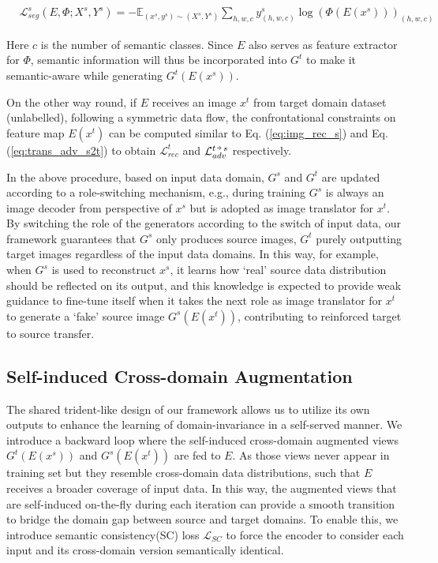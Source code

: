 \documentclass{bmvc2k}
\newcommand{\Eq}[1]{Eq. (\ref{eq:#1})}
\newcommand{\veryshortarrow}[1][3pt]{\mathrel{\hbox{\rule[\dimexpr\fontdimen22\textfont2-.2pt\relax]{#1}{.4pt}}\mkern-4mu\hbox{\usefont{U}{lasy}{m}{n}\symbol{41}}}}
\begin{document}
\begin{align}
    \label{eq:source_seg}
    &{\mathcal{L}^{s}_{seg}(E,\Phi; {X}^{s}, {Y}^{s})} = -\mathbb{E}_{({x}^{s}, {y}^{s})\sim ({X}^{s}, {Y}^{s})} \sum_{h,w,c} {y}^{s}_{(h,w,c)} \log( \Phi({E(x^{s})}))_{(h,w,c)}
\end{align}
\noindent 

Here $c$ is the number of semantic classes. Since ${E}$ also serves as feature extractor for ${\Phi}$, semantic information will thus be incorporated into ${G^{t}}$ to make it semantic-aware while generating ${G^{t}({E(x^{s})})}$. 




On the other way round, if ${E}$ receives an image ${{x}^{t}}$ from target domain dataset (unlabelled), following a symmetric data flow, the confrontational constraints on feature map ${E(x^{t})}$ can be computed similar to \Eq{img_rec_s} and \Eq{trans_adv_s2t} to obtain ${\mathcal{L}^{t}_{rec}}$ and ${\mathcal{L}^{t\,\veryshortarrow\,s}_{adv}}$ respectively.




In the above procedure, based on input data domain, ${G^{s}}$ and ${G^{t}}$ are updated according to a role-switching mechanism, e.g., during training ${G^{s}}$ is always an image decoder from perspective of $x^{s}$ but is adopted as image translator for $x^{t}$. By switching the role of the generators according to the switch of input data, our framework guarantees that ${G^{s}}$ only produces source images, ${G^{t}}$ purely outputting target images regardless of the input data domains. In this way, for example, when ${G^{s}}$ is used to reconstruct $x^{s}$, it learns how `real' source data distribution should be reflected on its output, and this knowledge is expected to provide weak guidance to fine-tune itself when it takes the next role as image translator for $x^{t}$ to generate a `fake' source image ${G^{s}({E(x^{t})})}$, 
contributing to reinforced target to source transfer. 


\subsection{Self-induced Cross-domain Augmentation}
\label{sec:self_induced}
The shared trident-like design of our framework allows us to utilize its own outputs to enhance the learning of domain-invariance in a self-served manner. We introduce a backward loop where the self-induced cross-domain augmented views ${G^{t}({E(x^{s})})}$ and ${G^{s}({E(x^{t})})}$ are fed to ${E}$. As those views never appear in training set but they resemble cross-domain data distributions, such that ${E}$ receives a broader coverage of input data. In this way, the augmented views that are self-induced on-the-fly during each iteration can provide a smooth transition to bridge the domain gap between source and target domains. To enable this, we introduce semantic consistency(SC) loss ${\mathcal{L}_{SC}}$ to force the encoder to consider each input and its cross-domain version semantically identical. 
\end{document}
